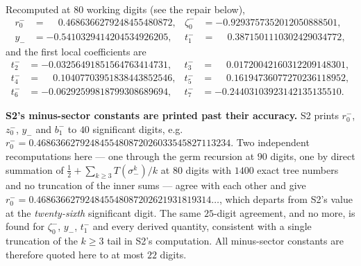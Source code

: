 \documentclass[11pt,a4paper,oneside]{book}
\theoremstyle{plain}
\theoremstyle{definition}
\theoremstyle{remark}
\begin{document}
Recomputed at $80$ working digits (see the repair below),
\begin{equation}
\begin{aligned}
 r^-_0&=\phantom{-}0.4686366279248455480872,&
 \zeta^-_0&=-0.9293757352012050888501,\\
 y_-&=-0.5410329414204534926205,&
 t^-_1&=\phantom{-}0.3871501110302429034772,
\end{aligned}
\label{p1:eq:minus-numeric}
\end{equation}
and the first local coefficients are
\begin{equation}
\begin{aligned}
 t^-_2&=-0.03256491851564763414731,&
 t^-_3&=\phantom{-}0.01720042160312209148301,\\
 t^-_4&=\phantom{-}0.10407703951838443852546,&
 t^-_5&=\phantom{-}0.16194736077270236118952,\\
 t^-_6&=-0.06292599818799308689694,&
 t^-_7&=-0.24403103923142135135510 .
\end{aligned}
\label{p1:eq:tminus-numeric}
\end{equation}

\begin{repairbox}
\textbf{\textsf{S2}'s minus-sector constants are printed past their accuracy.} \textsf{S2}
prints $r^-_0$, $z^-_0$, $y_-$ and $b^-_1$ to $40$ significant digits, e.g.\
$r^-_0=0.4686366279248455480872026033545827113234$.  Two independent recomputations here ---
one through the germ recursion at $90$ digits, one by direct summation of
$\tfrac12+\sum_{k\ge3}T(\sigma_-^{k})/k$ at $80$ digits with $1400$ exact tree numbers and no
truncation of the inner sums --- agree with each other and give
$r^-_0=0.468636627924845548087202621931819314\ldots$, which departs from \textsf{S2}'s value
at the \emph{twenty-sixth} significant digit.  The same $25$-digit agreement, and no more, is
found for $\zeta^-_0$, $y_-$, $t^-_1$ and every derived quantity, consistent with a single
truncation of the $k\ge3$ tail in \textsf{S2}'s computation.  All minus-sector constants are
therefore quoted here to at most $22$ digits.
\end{repairbox}
\end{document}
